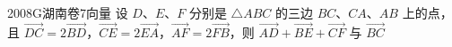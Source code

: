 
\begin{problem}{2008}{G}{湖南卷}{7}{向量}
设 $D$、$E$、$F$ 分别是 $\triangle ABC$ 的三边 $BC$、$CA$、$AB$ 上的点，且 $\overrightarrow{DC}=2\overrightarrow{BD}$，$\overrightarrow{CE}=2\overrightarrow{EA}$，$\overrightarrow{AF}=2\overrightarrow{FB}$，则 $\overrightarrow{AD}+\overrightarrow{BE}+\overrightarrow{CF}$ 与 $\overrightarrow{BC}$
\begin{choices}
\end{choices}
\end{problem}

\begin{answer}

\end{answer}

\begin{solutions}

\end{solutions}